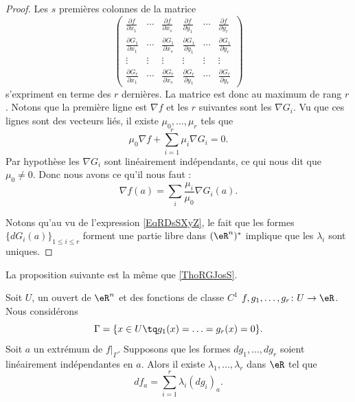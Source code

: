\begin{proof}
    Les \( s\) premières colonnes de la matrice
    \begin{equation}
        \begin{pmatrix}
            \frac{ \partial f }{ \partial x_1 }   &   \cdots    &   \frac{ \partial f }{ \partial x_s }    &   \frac{ \partial f }{ \partial y_1 }    &   \cdots    &   \frac{ \partial f }{ \partial y_r }\\  
            \frac{ \partial G_1 }{ \partial x_1 }    &   \cdots    &   \frac{ \partial G_1 }{ \partial x_s }    &   \frac{ \partial G_1 }{ \partial y_1 }    &   \cdots    &   \frac{ \partial G_1 }{ \partial y_r }\\
            \vdots    &   \vdots    &   \vdots    &   \vdots    &   \vdots    &   \vdots\\
            \frac{ \partial G_r }{ \partial x_1 }    &   \cdots    &   \frac{ \partial G_r }{ \partial x_s }    &   \frac{ \partial G_r }{ \partial y_1 }    &  \cdots   & \frac{ \partial G_r }{ \partial y_r }  
        \end{pmatrix}
    \end{equation}
    s'expriment en terme des \( r\) dernières. La matrice est donc au maximum de rang \( r\). Notons que la première ligne est \( \nabla f\) et les \( r\) suivantes sont les \( \nabla G_i\). Vu que ces lignes sont des vecteurs liés, il existe \( \mu_0,\ldots, \mu_r\) tels que
    \begin{equation}
        \mu_0\nabla f+\sum_{i=1}^r\mu_i\nabla G_i=0.
    \end{equation}
    Par hypothèse les \( \nabla G_i\) sont linéairement indépendants, ce qui nous dit que \( \mu_0\neq 0\). Donc nous avons ce qu'il nous faut :
    \begin{equation}
        \nabla f(a)=\sum_i\frac{ \mu_i }{ \mu_0 } \nabla G_i(a).
    \end{equation}

    Notons qu'au vu de l'expression \eqref{EqRDsSXyZ}, le fait que les formes \( \{ dG_i(a) \}_{1\leq i\leq r}\) forment une partie libre dans \( (\eR^n)^*\) implique que les \( \lambda_i\) sont uniques.
\end{proof}

La proposition suivante est la même que \ref{ThoRGJosS}.
\begin{proposition} \label{PropfPPUxh}
    Soit \( U\), un ouvert de \( \eR^n\) et des fonctions de classe \( C^1\) \( f,g_1,\ldots, g_r\colon U\to \eR\). Nous considérons
    \begin{equation}
        \Gamma=\{ x\in U\tq g_1(x)=\ldots=g_r(x)=0 \}.
    \end{equation}
    Soit \( a\) un extrémum de \( f|_{\Gamma}\). Supposons que les formes \( dg_1,\ldots, dg_r\) soient linéairement indépendantes en \( a\). Alors il existe \( \lambda_1,\ldots, \lambda_r\) dans \( \eR\) tel que
    \begin{equation}
        df_a=\sum_{i=1}^r\lambda_i(dg_i)_a.
    \end{equation}
\end{proposition}

